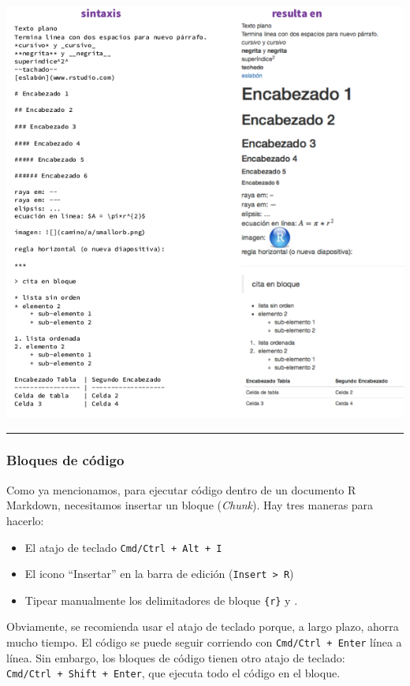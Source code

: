 \documentclass[
]{article}
\providecommand{\tightlist}{%
  \setlength{\itemsep}{0pt}\setlength{\parskip}{0pt}}
\begin{document}
\includegraphics{img/Selection_001.png}

\begin{center}\rule{0.5\linewidth}{0.5pt}\end{center}

\subsubsection{Bloques de código}\label{bloques-de-cuxf3digo}

Como ya mencionamos, para ejecutar código dentro de un documento R
Markdown, necesitamos insertar un bloque (\emph{Chunk}). Hay tres
maneras para hacerlo:

\begin{itemize}
\tightlist
\item
  El atajo de teclado \texttt{Cmd/Ctrl\ +\ Alt\ +\ I}
\item
  El icono ``Insertar'' en la barra de edición
  (\texttt{Insert\ \textgreater{}\ R})
\item
  Tipear manualmente los delimitadores de bloque
  \texttt{\textasciigrave{}\textasciigrave{}\textasciigrave{}\{r\}} y
  \texttt{\textasciigrave{}\textasciigrave{}\textasciigrave{}}.
\end{itemize}

Obviamente, se recomienda usar el atajo de teclado porque, a largo
plazo, ahorra mucho tiempo. El código se puede seguir corriendo con
\texttt{Cmd/Ctrl\ +\ Enter} línea a línea. Sin embargo, los bloques de
código tienen otro atajo de teclado:
\texttt{Cmd/Ctrl\ +\ Shift\ +\ Enter}, que ejecuta todo el código en el
bloque.
\end{document}
